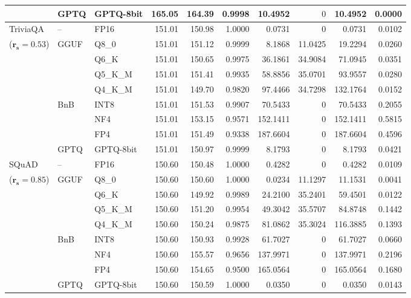 \begin{longtable}{ll l rrrrrrr}
 & GPTQ & GPTQ-8bit & 165.05 & 164.39 & 0.9998 & 10.4952 & \cellcolor{cyan!12} $0$ & 10.4952 & 0.0000 \\
\midrule
TriviaQA & -- & FP16 & 151.01 & 150.98 & 1.0000 & 0.0731 & \cellcolor{cyan!12} $0$ & 0.0731 & 0.0102 \\
{\small ($\mathbf{r_s{=}0.53}$)} & GGUF & Q8\_0 & 151.01 & 151.12 & 0.9999 & 8.1868 & 11.0425 & 19.2294 & 0.0260 \\
 &  & Q6\_K & 151.01 & 150.65 & 0.9975 & 36.1861 & 34.9084 & 71.0945 & 0.0351 \\
 &  & Q5\_K\_M & 151.01 & 151.41 & 0.9935 & 58.8856 & 35.0701 & 93.9557 & 0.0280 \\
 &  & Q4\_K\_M & 151.01 & 149.70 & 0.9820 & 97.4466 & 34.7298 & 132.1764 & 0.0152 \\
 & BnB & INT8 & 151.01 & 151.53 & 0.9907 & 70.5433 & \cellcolor{cyan!12} $0$ & 70.5433 & 0.2055 \\
 &  & NF4 & 151.01 & 153.15 & 0.9571 & 152.1411 & \cellcolor{cyan!12} $0$ & 152.1411 & 0.5815 \\
 &  & FP4 & 151.01 & 151.49 & \cellcolor{red!18} 0.9338 & \cellcolor{red!18} 187.6604 & \cellcolor{cyan!12} $0$ & \cellcolor{red!18} 187.6604 & \cellcolor{red!18} 0.4596 \\
 & GPTQ & GPTQ-8bit & 151.01 & 150.97 & 0.9999 & 8.1793 & \cellcolor{cyan!12} $0$ & 8.1793 & 0.0421 \\
\midrule
SQuAD & -- & FP16 & 150.60 & 150.48 & 1.0000 & 0.4282 & \cellcolor{cyan!12} $0$ & 0.4282 & 0.0109 \\
{\small ($\mathbf{r_s{=}0.85}$)} & GGUF & Q8\_0 & 150.60 & 150.60 & 1.0000 & 0.0234 & 11.1297 & 11.1531 & 0.0041 \\
 &  & Q6\_K & 150.60 & 149.92 & 0.9989 & 24.2100 & 35.2401 & 59.4501 & 0.0122 \\
 &  & Q5\_K\_M & 150.60 & 151.20 & 0.9954 & 49.3042 & 35.5707 & 84.8748 & 0.1442 \\
 &  & Q4\_K\_M & 150.60 & 150.24 & 0.9875 & 81.0862 & 35.3024 & 116.3885 & 0.1393 \\
 & BnB & INT8 & 150.60 & 150.93 & 0.9928 & 61.7027 & \cellcolor{cyan!12} $0$ & 61.7027 & 0.0660 \\
 &  & NF4 & 150.60 & 155.57 & 0.9656 & 137.9971 & \cellcolor{cyan!12} $0$ & 137.9971 & 0.2196 \\
 &  & FP4 & 150.60 & 154.65 & 0.9500 & 165.0564 & \cellcolor{cyan!12} $0$ & 165.0564 & 0.1680 \\
 & GPTQ & GPTQ-8bit & 150.60 & 150.59 & 1.0000 & 0.0350 & \cellcolor{cyan!12} $0$ & 0.0350 & 0.0143 \\

\end{longtable}
